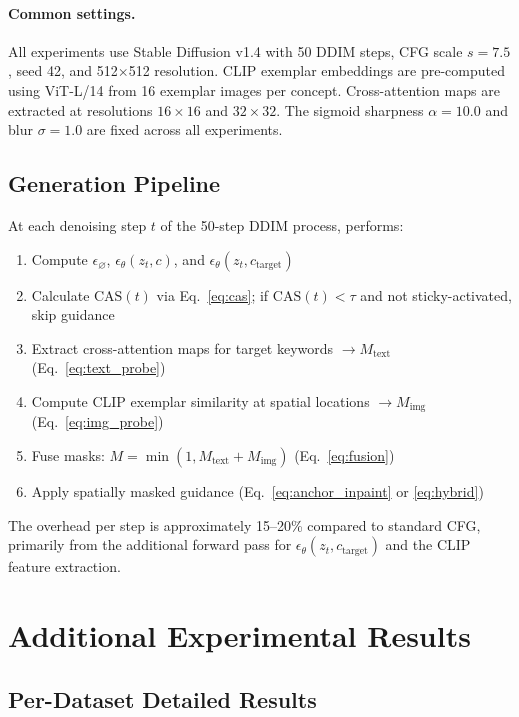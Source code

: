 \paragraph{Common settings.} All experiments use Stable Diffusion v1.4 with 50 DDIM steps, CFG scale $s\!=\!7.5$, seed 42, and 512$\times$512 resolution. CLIP exemplar embeddings are pre-computed using ViT-L/14 from 16 exemplar images per concept. Cross-attention maps are extracted at resolutions $16\times16$ and $32\times32$. The sigmoid sharpness $\alpha\!=\!10.0$ and blur $\sigma\!=\!1.0$ are fixed across all experiments.

\subsection{Generation Pipeline}
\label{app:pipeline}

At each denoising step $t$ of the 50-step DDIM process, \ours{} performs:
\begin{enumerate}[leftmargin=1.5em,itemsep=1pt]
    \item Compute $\epsilon_\varnothing$, $\epsilon_\theta(z_t, c)$, and $\epsilon_\theta(z_t, c_\text{target})$
    \item Calculate $\text{CAS}(t)$ via Eq.~\ref{eq:cas}; if $\text{CAS}(t) < \tau$ and not sticky-activated, skip guidance
    \item Extract cross-attention maps for target keywords $\rightarrow M_\text{text}$ (Eq.~\ref{eq:text_probe})
    \item Compute CLIP exemplar similarity at spatial locations $\rightarrow M_\text{img}$ (Eq.~\ref{eq:img_probe})
    \item Fuse masks: $M = \min(1, M_\text{text} + M_\text{img})$ (Eq.~\ref{eq:fusion})
    \item Apply spatially masked guidance (Eq.~\ref{eq:anchor_inpaint} or \ref{eq:hybrid})
\end{enumerate}
The overhead per step is approximately 15--20\% compared to standard CFG, primarily from the additional forward pass for $\epsilon_\theta(z_t, c_\text{target})$ and the CLIP feature extraction.

\section{Additional Experimental Results}
\label{app:additional}

\subsection{Per-Dataset Detailed Results}
\label{app:per_dataset}

